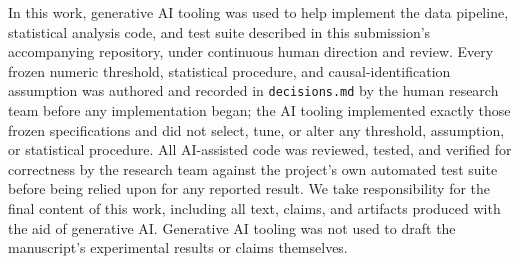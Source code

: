 In this work, generative AI tooling was used to help implement the data
pipeline, statistical analysis code, and test suite described in this
submission's accompanying repository, under continuous human direction
and review. Every frozen numeric threshold, statistical procedure, and
causal-identification assumption was authored and recorded in
\texttt{decisions.md} by the human research team before any
implementation began; the AI tooling implemented exactly those frozen
specifications and did not select, tune, or alter any threshold,
assumption, or statistical procedure. All AI-assisted code was reviewed,
tested, and verified for correctness by the research team against the
project's own automated test suite before being relied upon for any
reported result. We take responsibility for the final content of this
work, including all text, claims, and artifacts produced with the aid of
generative AI. Generative AI tooling was not used to draft the
manuscript's experimental results or claims themselves.
